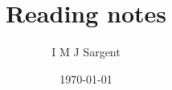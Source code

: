 \documentclass[a4paper]{article} %
\title{\textbf{Reading notes}}
\author{I M J Sargent}
\date{\today} %
\begin{document}

\maketitle %


\begin{refsection}
\renewcommand*{\mkbibcompletename}[1]{%
  \ifitemannotation{highlight}
    {\textbf{#1}}
    {#1}}

\end{refsection}
\end{document}
